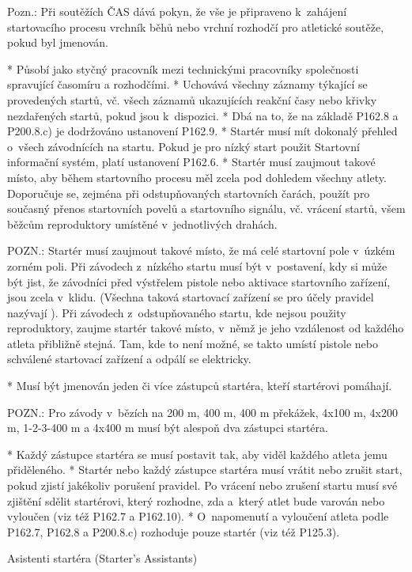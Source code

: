   Pozn.: Při soutěžích ČAS dává pokyn, že vše je připraveno k~zahájení startovacího procesu vrchník běhů nebo vrchní rozhodčí pro atletické soutěže, pokud byl jmenován.

  * Působí jako styčný pracovník mezi technickými pracovníky společnosti spravující časomíru a rozhodčími.
  * Uchovává všechny záznamy týkající se provedených startů, vč. všech záznamů ukazujících reakční časy nebo křivky nezdařených startů, pokud jsou k~dispozici.
  * Dbá na to, že na základě P162.8 a P200.8.c) je dodržováno ustanovení P162.9.
  \enditems
* Startér musí mít dokonalý přehled o~všech závodnících na startu. Pokud je pro nízký start použit Startovní informační systém, platí ustanovení P162.6.
* Startér musí zaujmout takové místo, aby během startovního procesu měl zcela pod dohledem všechny atlety. Doporučuje se, zejména při odstupňovaných startovních čarách, použít pro současný přenos startovních povelů a startovního signálu, vč. vrácení startů, všem běžcům reproduktory umístěné v~jednotlivých drahách.

POZN.: Startér musí zaujmout takové místo, že má celé startovní pole v~úzkém zorném poli. Při závodech z~nízkého startu musí být v~postavení, kdy si může být jist, že závodníci před výstřelem pistole nebo aktivace startovního zařízení, jsou zcela v~klidu. (Všechna taková startovací zařízení se pro účely pravidel nazývají ). Při závodech z~odstupňovaného startu, kde nejsou použity reproduktory, zaujme startér takové místo, v~němž je jeho vzdálenost od každého atleta přibližně stejná. Tam, kde to není možné, se takto umístí pistole nebo schválené startovací zařízení a odpálí se elektricky.

* Musí být jmenován jeden či více zástupců startéra, kteří startérovi pomáhají.

POZN.: Pro závody v~bězích na 200 m, 400 m, 400 m překážek, 4x100 m, 4x200 m, 1-2-3-400 m a 4x400 m musí být alespoň dva zástupci startéra.

* Každý zástupce startéra se musí postavit tak, aby viděl každého atleta jemu přiděleného.
* Startér nebo každý zástupce startéra musí vrátit nebo zrušit start, pokud zjistí jakékoliv porušení pravidel. Po vrácení nebo zrušení startu musí své zjištění sdělit startérovi, který rozhodne, zda a~který atlet bude varován nebo vyloučen (viz též P162.7 a P162.10).
* O~napomenutí a vyloučení atleta podle P162.7, P162.8 a P200.8.c) rozhoduje pouze startér (viz též P125.3).
\enditems

\secc Asistenti startéra (Starter’s Assistants)

